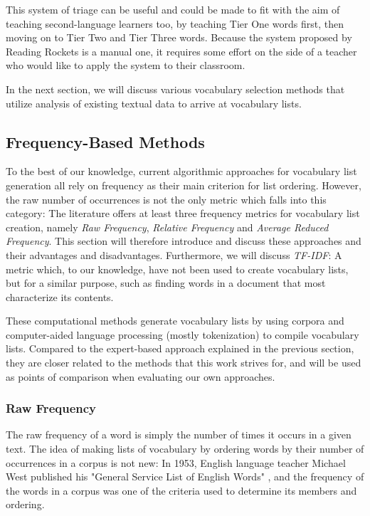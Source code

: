 This system of triage can be useful and could be made to fit with the aim of teaching second-language learners too, by teaching Tier One words first, then moving on to Tier Two and Tier Three words.
Because the system proposed by Reading Rockets is a manual one, it requires some effort on the side of a teacher who would like to apply the system to their classroom.

In the next section, we will discuss various vocabulary selection methods that utilize analysis of existing textual data to arrive at vocabulary lists.

\subsection{Frequency-Based Methods}
To the best of our knowledge, current algorithmic approaches for vocabulary list generation all rely on frequency as their main criterion for list ordering.
However, the raw number of occurrences is not the only metric which falls into this category:
The literature offers at least three frequency metrics for vocabulary list creation, namely \textit{Raw Frequency}, \textit{Relative Frequency} and \textit{Average Reduced Frequency}.
This section will therefore introduce and discuss these approaches and their advantages and disadvantages.
Furthermore, we will discuss \textit{TF-IDF}:
A metric which, to our knowledge, have not been used to create vocabulary lists, but for a similar purpose, such as finding words in a document that most characterize its contents.

These computational methods generate vocabulary lists by using corpora and computer-aided language processing (mostly tokenization) to compile vocabulary lists.
Compared to the expert-based approach explained in the previous section, they are closer related to the methods that this work strives for, and will be used as points of comparison when evaluating our own approaches.

\subsubsection {Raw Frequency}
The raw frequency of a word is simply the number of times it occurs in a given text.
The idea of making lists of vocabulary by ordering words by their number of occurrences in a corpus is not new:
In 1953, English language teacher Michael West published his "General Service List of English Words" \cite{michaelwestGeneralServiceList1953}, and the frequency of the words in a corpus was one of the criteria used to determine its members and ordering.

